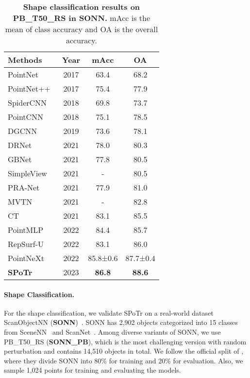 \documentclass[10pt,twocolumn,letterpaper]{article}
\begin{document}
\begin{table}[t]
  \centering
\setlength{\tabcolsep}{8pt}
\begin{tabular}{l|c|c c}
    \toprule
    Methods & Year & mAcc & OA \\
    \midrule
    PointNet~\cite{qi2017pointnet} & 2017 &  63.4 &68.2\\
    PointNet++~\cite{qi2017pointnet++} & 2017 & 75.4 & 77.9 \\
SpiderCNN~\cite{xu2018spidercnn}& 2018& 69.8 & 73.7\\
    PointCNN~\cite{li2018pointcnn}&2018& 75.1 & 78.5 \\
    DGCNN~\cite{wang2019dynamic}&2019& 73.6 & 78.1\\
    DRNet~\cite{qiu2021dense}&2021& 78.0 & 80.3 \\
    GBNet~\cite{qiu2021geometric}&2021& 77.8 & 80.5 \\
    SimpleView~\cite{goyal2021revisiting}&2021 &-& 80.5\\
    PRA-Net~\cite{cheng2021net}&2021& 77.9 & 81.0 \\
    MVTN~\cite{hamdi2021mvtn}&2021 & - & 82.8 \\
CT~\cite{mazur2021cloud} & 2021 & 83.1 & 85.5 \\
    PointMLP~\cite{ma2022rethinking} & 2022 & 84.4 & 85.7 \\
    RepSurf-U~\cite{ran2022surface} & 2022 & 83.1 & 86.0 \\
    \rowcolor{LightYellow}PointNeXt~\cite{qian2022pointnext}& 2022 & 85.8±0.6 & 87.7±0.4\\
    \midrule
    \rowcolor{LightRed}\textbf{SPoTr}& 2023 & \textbf{86.8} &\textbf{88.6} \\
    \bottomrule
  \end{tabular}
  \caption{\textbf{Shape classification results on PB\_T50\_RS in SONN.}
  \label{tab:sonn}
  mAcc is the mean of class accuracy and OA is the overall accuracy.
  }
\end{table} 


 
\paragraph{Shape Classification.}
For the shape classification, we validate SPoTr on a real-world dataset ScanObjectNN (\textbf{SONN})~\cite{uy2019revisiting}. 
SONN has 2,902 objects categorized into 15 classes from SceneNN~\cite{hua2016scenenn} and ScanNet~\cite{dai2017scannet}.
Among diverse variants of SONN, we use PB\_T50\_RS (\textbf{SONN\_PB}), which is the most challenging version with random perturbation and contains 14,510 objects in total.
We follow the official split of \cite{uy2019revisiting}, where they divide SONN into 80\% for training and 20\% for evaluation.
Also, we sample 1,024 points for training and evaluating the models. 
\end{document}
